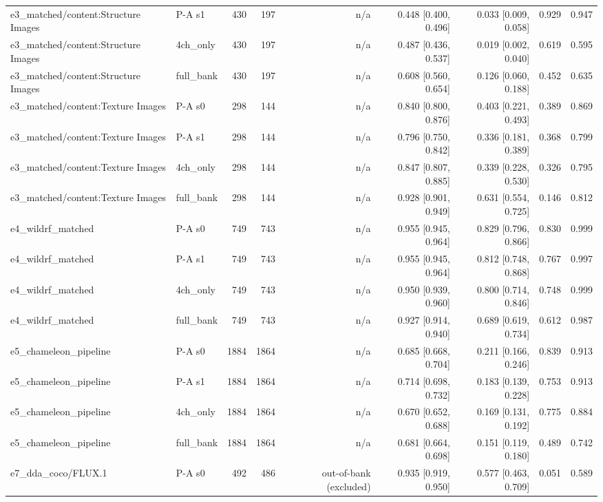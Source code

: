 \begin{table}[htbp]
\begin{tabular}{llrrrrrrr}
e3\_matched/content:Structure Images & P-A s1 & 430 & 197 & n/a & 0.448 [0.400, 0.496] & 0.033 [0.009, 0.058] & 0.929 & 0.947 \\
e3\_matched/content:Structure Images & 4ch\_only & 430 & 197 & n/a & 0.487 [0.436, 0.537] & 0.019 [0.002, 0.040] & 0.619 & 0.595 \\
e3\_matched/content:Structure Images & full\_bank & 430 & 197 & n/a & 0.608 [0.560, 0.654] & 0.126 [0.060, 0.188] & 0.452 & 0.635 \\
e3\_matched/content:Texture Images & P-A s0 & 298 & 144 & n/a & 0.840 [0.800, 0.876] & 0.403 [0.221, 0.493] & 0.389 & 0.869 \\
e3\_matched/content:Texture Images & P-A s1 & 298 & 144 & n/a & 0.796 [0.750, 0.842] & 0.336 [0.181, 0.389] & 0.368 & 0.799 \\
e3\_matched/content:Texture Images & 4ch\_only & 298 & 144 & n/a & 0.847 [0.807, 0.885] & 0.339 [0.228, 0.530] & 0.326 & 0.795 \\
e3\_matched/content:Texture Images & full\_bank & 298 & 144 & n/a & 0.928 [0.901, 0.949] & 0.631 [0.554, 0.725] & 0.146 & 0.812 \\
e4\_wildrf\_matched & P-A s0 & 749 & 743 & n/a & 0.955 [0.945, 0.964] & 0.829 [0.796, 0.866] & 0.830 & 0.999 \\
e4\_wildrf\_matched & P-A s1 & 749 & 743 & n/a & 0.955 [0.945, 0.964] & 0.812 [0.748, 0.868] & 0.767 & 0.997 \\
e4\_wildrf\_matched & 4ch\_only & 749 & 743 & n/a & 0.950 [0.939, 0.960] & 0.800 [0.714, 0.846] & 0.748 & 0.999 \\
e4\_wildrf\_matched & full\_bank & 749 & 743 & n/a & 0.927 [0.914, 0.940] & 0.689 [0.619, 0.734] & 0.612 & 0.987 \\
e5\_chameleon\_pipeline & P-A s0 & 1884 & 1864 & n/a & 0.685 [0.668, 0.704] & 0.211 [0.166, 0.246] & 0.839 & 0.913 \\
e5\_chameleon\_pipeline & P-A s1 & 1884 & 1864 & n/a & 0.714 [0.698, 0.732] & 0.183 [0.139, 0.228] & 0.753 & 0.913 \\
e5\_chameleon\_pipeline & 4ch\_only & 1884 & 1864 & n/a & 0.670 [0.652, 0.688] & 0.169 [0.131, 0.192] & 0.775 & 0.884 \\
e5\_chameleon\_pipeline & full\_bank & 1884 & 1864 & n/a & 0.681 [0.664, 0.698] & 0.151 [0.119, 0.180] & 0.489 & 0.742 \\
e7\_dda\_coco/FLUX.1 & P-A s0 & 492 & 486 & out-of-bank (excluded) & 0.935 [0.919, 0.950] & 0.577 [0.463, 0.709] & 0.051 & 0.589 \\

\end{tabular}
\end{table}
